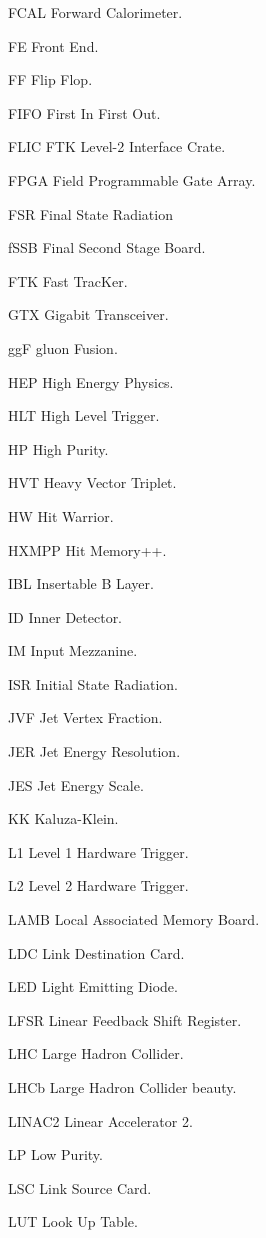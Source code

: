 \begin{symbollist*}
\item[FCAL] Forward Calorimeter.
\item[FE] Front End.
\item[FF] Flip Flop.
\item[FIFO] First In First Out.
\item[FLIC] FTK Level-2 Interface Crate.
\item[FPGA] Field Programmable Gate Array.
\item[FSR] Final State Radiation
\item[fSSB] Final Second Stage Board.
\item[FTK] Fast TracKer.
\item[GTX] Gigabit Transceiver.
\item[ggF] gluon Fusion.
\item[HEP] High Energy Physics.
\item[HLT] High Level Trigger.
\item[HP] High Purity.
\item[HVT] Heavy Vector Triplet.
\item[HW] Hit Warrior.
\item[HXMPP] Hit Memory++.
\item[IBL] Insertable B Layer.
\item[ID] Inner Detector.
\item[IM] Input Mezzanine.
\item[ISR] Initial State Radiation.
\item[JVF] Jet Vertex Fraction.
\item[JER] Jet Energy Resolution.
\item[JES] Jet Energy Scale.
\item[KK] Kaluza-Klein.
\item[L1] Level 1 Hardware Trigger.
\item[L2] Level 2 Hardware Trigger.
\item[LAMB] Local Associated Memory Board.
\item[LDC] Link Destination Card.
\item[LED] Light Emitting Diode.
\item[LFSR] Linear Feedback Shift Register.
\item[LHC] Large Hadron Collider.
\item[LHCb] Large Hadron Collider beauty.
\item[LINAC2] Linear Accelerator 2.
\item[LP] Low Purity.
\item[LSC] Link Source Card.
\item[LUT] Look Up Table.

\end{symbollist*}
